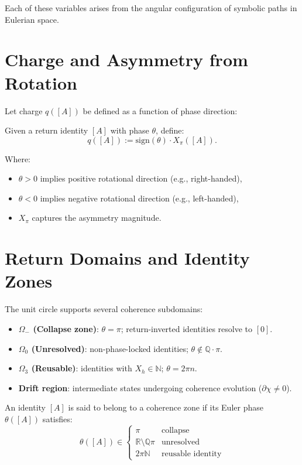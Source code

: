 Each of these variables arises from the angular configuration of symbolic paths in Eulerian space.

\section{Charge and Asymmetry from Rotation}

Let charge $q([A])$ be defined as a function of phase direction:

\begin{definition}
Given a return identity $[A]$ with phase $\theta$, define:
\[
q([A]) := \text{sign}(\theta) \cdot X_\pi([A]).
\]
\end{definition}

\noindent Where:
\begin{itemize}
    \item $\theta > 0$ implies positive rotational direction (e.g., right-handed),
    \item $\theta < 0$ implies negative rotational direction (e.g., left-handed),
    \item $X_\pi$ captures the asymmetry magnitude.
\end{itemize}

\section{Return Domains and Identity Zones}

The unit circle supports several coherence subdomains:

\begin{itemize}
    \item \textbf{$\Omega_-$ (Collapse zone)}: $\theta = \pi$; return-inverted identities resolve to $[0]$.
    \item \textbf{$\Omega_0$ (Unresolved)}: non-phase-locked identities; $\theta \notin \mathbb{Q} \cdot \pi$.
    \item \textbf{$\Omega_3$ (Reusable)}: identities with $X_h \in \mathbb{N}$; $\theta = 2\pi n$.
    \item \textbf{Drift region}: intermediate states undergoing coherence evolution ($\partial \chi \neq 0$).
\end{itemize}

\begin{definition}
An identity $[A]$ is said to belong to a coherence zone if its Euler phase $\theta([A])$ satisfies:
\[
\theta([A]) \in \begin{cases}
\pi & \text{collapse} \\
\mathbb{R} \setminus \mathbb{Q}\pi & \text{unresolved} \\
2\pi \mathbb{N} & \text{reusable identity}
\end{cases}
\]
\end{definition}

